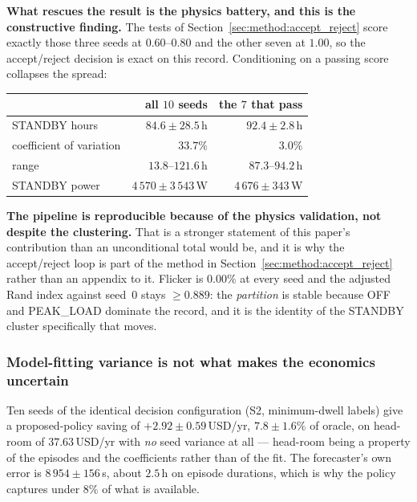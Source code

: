 \textbf{What rescues the result is the physics battery, and this is the
constructive finding.} The tests of
Section~\ref{sec:method:accept_reject} score exactly those three seeds
at $0.60$--$0.80$ and the other seven at $1.00$, so the accept/reject
decision is exact on this record. Conditioning on a passing score
collapses the spread:

\begin{center}
\small
\begin{tabular}{@{}lrr@{}}
\toprule
 & all $10$ seeds & the $7$ that pass \\
\midrule
STANDBY hours   & $84.6\pm28.5$\,h & $\mathbf{92.4\pm2.8}$\,h \\
coefficient of variation & $\mathbf{33.7\%}$ & $\mathbf{3.0\%}$ \\
range           & $13.8$--$121.6$\,h & $87.3$--$94.2$\,h \\
STANDBY power   & $4\,570\pm3\,543$\,W & $4\,676\pm343$\,W \\
\bottomrule
\end{tabular}
\end{center}

\textbf{The pipeline is reproducible because of the physics validation,
not despite the clustering.} That is a stronger statement of this
paper's contribution than an unconditional total would be, and it is why
the accept/reject loop is part of the method in
Section~\ref{sec:method:accept_reject} rather than an appendix to it.
Flicker is $0.00\%$ at every seed and the adjusted Rand index against
seed~$0$ stays $\ge0.889$: the \emph{partition} is stable because OFF
and PEAK\_LOAD dominate the record, and it is the identity of the
STANDBY cluster specifically that moves.

\subsubsection{Model-fitting variance is not what makes the economics
uncertain}

Ten seeds of the identical decision configuration (S2, minimum-dwell
labels) give a proposed-policy saving of
$\mathbf{+2.92\pm0.59}$\,USD/yr, $7.8\pm1.6\%$ of oracle, on head-room
of $37.63$\,USD/yr with \emph{no} seed variance at all --- head-room
being a property of the episodes and the coefficients rather than of the
fit. The forecaster's own error is $8\,954\pm156$\,s, about $2.5$\,h on
episode durations, which is why the policy captures under $8\%$ of what
is available.

